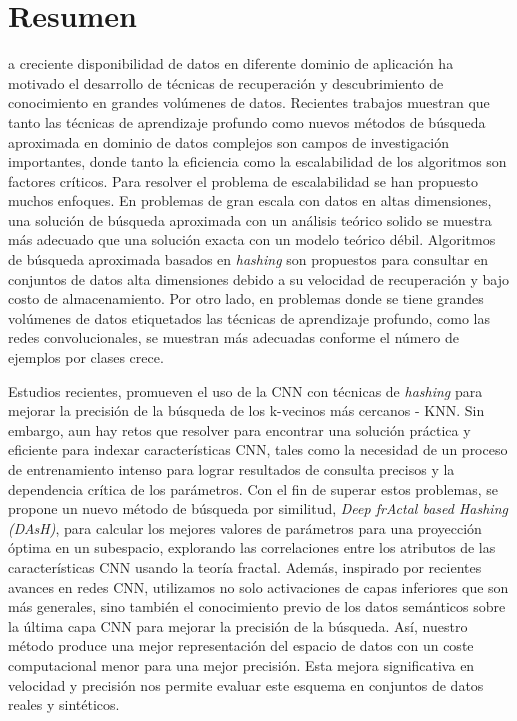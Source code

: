%
%
%

\chapter*{Resumen}
\begin{SingleSpace}
a creciente disponibilidad de datos en diferente dominio de aplicación ha motivado el desarrollo de técnicas de recuperación y descubrimiento de conocimiento en grandes volúmenes de datos.   Recientes trabajos muestran que tanto las técnicas de aprendizaje profundo como  nuevos métodos de búsqueda aproximada en dominio de datos complejos son campos de investigación importantes, donde tanto la eficiencia como la  escalabilidad de los algoritmos son factores críticos. Para resolver el problema de escalabilidad se han propuesto muchos enfoques. En problemas de gran escala con datos en altas dimensiones, una solución de búsqueda aproximada con un análisis teórico solido se muestra más adecuado que una solución exacta con un modelo teórico débil.    Algoritmos de búsqueda aproximada  basados en \textit{hashing} son propuestos para consultar en conjuntos de datos  alta dimensiones debido a su velocidad de recuperación y bajo costo de almacenamiento.  Por otro lado, en problemas donde se tiene grandes volúmenes de datos etiquetados las técnicas de aprendizaje profundo, como las redes convolucionales, se muestran más adecuadas conforme el número de ejemplos por clases crece.

Estudios recientes, promueven el uso de la \acf{CNN} con técnicas de  \textit{hashing} para mejorar la precisión de la búsqueda de los k-vecinos más cercanos - KNN.  Sin embargo, aun hay retos que resolver para encontrar una solución práctica y eficiente para indexar características  CNN, tales como la necesidad de un proceso de entrenamiento intenso para lograr resultados de consulta precisos y la dependencia crítica de los parámetros.   Con el fin de superar estos problemas, se propone un nuevo método de búsqueda por similitud, \textit{Deep frActal based  Hashing (DAsH)}, para calcular los mejores valores de parámetros  para una proyección óptima en un subespacio, explorando las correlaciones entre los atributos de las características  CNN usando la teoría fractal. Además, inspirado por recientes avances  en redes CNN, utilizamos no solo activaciones de capas inferiores que son más generales, sino también el conocimiento previo de los datos semánticos sobre la última capa CNN para mejorar la precisión de la búsqueda.  Así, nuestro método produce una mejor representación del espacio de datos con un coste computacional menor para una mejor precisión. Esta mejora  significativa en velocidad y precisión nos permite evaluar este esquema en conjuntos de datos reales y sintéticos.


\end{SingleSpace}
